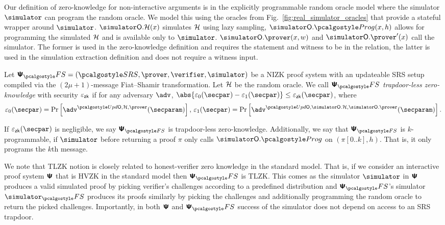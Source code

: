  Our definition of zero-knowledge for non-interactive
arguments is in the explicitly programmable random oracle model where the simulator
$\simulator$ can program the random oracle. 
We model this using the oracles from Fig.~\ref{fig:real_simulator_oracles} that provide a stateful wrapper around $\simulator$.
$\simOH (x)$ simulates $\mathcal{H}$ using lazy sampling, $\simulator\oracleo.\prog(x, h)$ allows for programming the simulated $\mathcal{H}$ and is available only to $\simulator$. $\simOP(x, w)$ and $\simOP'(x)$ call the simulator. The former is used in the zero-knowledge definition and requires the statement and witness to be in the relation, the latter is used in the simulation extraction definition and does not require a witness input.

\begin{definition}
  \label{def:tls}
  Let 
  $\psfs = (\SRScer, \prover, \verifier, \simulator)$ be a NIZK proof system with an updateable SRS setup compiled via the $(2\mu + 1)$-message Fiat--Shamir transformation. Let $\mathcal{H}$ be the random oracle. 
  We call $\psfs$ \emph{trapdoor-less zero-knowledge} with security $\varepsilon_{\mathsf{zk}}$ if for any
  adversary $\adv$, $\abs{\eps_0(\secpar) - \eps_1(\secpar)} \leq \epszk(\secpar)$, where
  \begin{align*}
    \eps_0 (\secpar) = \Pr\left[ \adv^{\initU, \ro, \prover} (\secparam) \right],\,
    \eps_1 (\secpar)=  \Pr \left[\adv^{\initU, \simOH, \simOP} (\secparam) \right].
  \end{align*}
  
  If $\epszk(\secpar)$ is negligible, we say $\ps_{\fs}$ is trapdoor-less zero-knowledge. Additionally, we say that $\ps_{\fs}$ is $k$-programmable, if  $\simulator$ before returning a proof $\pi$ only calls $\simulator\oracleo.\prog$ on $(\pi[0..k],h)$. That is, it only programs the $k$th message.
  \end{definition}

  
\begin{remark}
  We note that TLZK notion is closely related to honest-verifier zero knowledge in the
  standard model. That is, if we consider an interactive proof system $\bm{\mathsf{\Psi}}$
  that is HVZK in the standard model then $\proofsystem_\fs$ is TLZK. This comes as the simulator $\simulator$ in
  $\bm{\mathsf{\Psi}}$ produces a valid simulated proof by picking verifier's challenges
  according to a predefined distribution and $\proofsystem_\fs$'s simulator
  $\simulator_\fs$ produces its proofs similarly by picking the challenges and
  additionally programming the random oracle to return the picked
  challenges. Importantly, in both $\bm{\mathsf{\Psi}}$ and $\proofsystem_\fs$ success of
  the simulator does not depend on access to an SRS trapdoor.
\end{remark}

